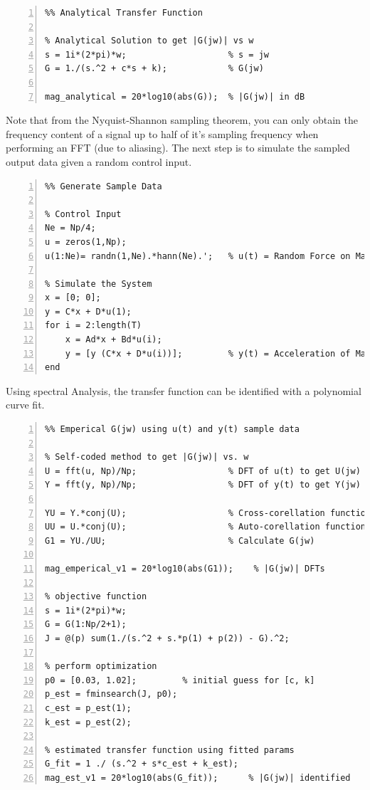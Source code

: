\documentclass{article}
\begin{document}
\begin{lstlisting}[style=Matlab-editor, caption={\texttt{Analytical Transfer Function}},frame=single, numbers=left]
%%%%%%%%%%%%%%%%%%%%%%%%%%%%%%%%%%%%%%%%%%%%%%%%%%%%%%%%%%%%%%%%%%%%%%%
%% Analytical Transfer Function 

% Analytical Solution to get |G(jw)| vs w
s = 1i*(2*pi)*w;                    % s = jw
G = 1./(s.^2 + c*s + k);            % G(jw)

mag_analytical = 20*log10(abs(G));  % |G(jw)| in dB
\end{lstlisting}

 Note that from the Nyquist-Shannon sampling theorem, you can only obtain the frequency content of a signal up to half of it's sampling frequency when performing an FFT (due to aliasing). The next step is to simulate the sampled output data given a random control input.

\begin{lstlisting}[style=Matlab-editor, caption={\texttt{Simulating a Random Control Input}},frame=single, numbers=left]
%%%%%%%%%%%%%%%%%%%%%%%%%%%%%%%%%%%%%%%%%%%%%%%%%%%%%%%%%%%%%%%%%%%%%%%
%% Generate Sample Data

% Control Input
Ne = Np/4;
u = zeros(1,Np);
u(1:Ne)= randn(1,Ne).*hann(Ne).';   % u(t) = Random Force on Mass

% Simulate the System
x = [0; 0];
y = C*x + D*u(1);
for i = 2:length(T)
    x = Ad*x + Bd*u(i);
    y = [y (C*x + D*u(i))];         % y(t) = Acceleration of Mass
end
\end{lstlisting}

Using spectral Analysis, the transfer function can be identified with a polynomial curve fit.

\begin{lstlisting}[style=Matlab-editor, caption={\texttt{System Identification, Method 1}},frame=single, numbers=left]
%%%%%%%%%%%%%%%%%%%%%%%%%%%%%%%%%%%%%%%%%%%%%%%%%%%%%%%%%%%%%%%%%%%%%%%
%% Emperical G(jw) using u(t) and y(t) sample data

% Self-coded method to get |G(jw)| vs. w
U = fft(u, Np)/Np;                  % DFT of u(t) to get U(jw)
Y = fft(y, Np)/Np;                  % DFT of y(t) to get Y(jw)

YU = Y.*conj(U);                    % Cross-corellation function
UU = U.*conj(U);                    % Auto-corellation function
G1 = YU./UU;                        % Calculate G(jw)

mag_emperical_v1 = 20*log10(abs(G1));    % |G(jw)| DFTs 

% objective function
s = 1i*(2*pi)*w;
G = G(1:Np/2+1);
J = @(p) sum(1./(s.^2 + s.*p(1) + p(2)) - G).^2;

% perform optimization
p0 = [0.03, 1.02];         % initial guess for [c, k]
p_est = fminsearch(J, p0);
c_est = p_est(1);
k_est = p_est(2);

% estimated transfer function using fitted params
G_fit = 1 ./ (s.^2 + s*c_est + k_est);
mag_est_v1 = 20*log10(abs(G_fit));      % |G(jw)| identified
\end{lstlisting}
\end{document}
